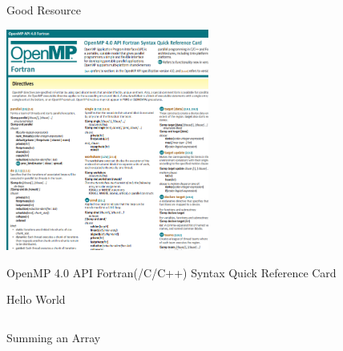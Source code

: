 \documentclass[10pt]{beamer}
\begin{document}
\begin{frame}{Good Resource}

\includegraphics[width=0.5\textwidth]{omp_cheat.png}

{\tiny OpenMP 4.0 API Fortran(/C/C++) Syntax Quick Reference Card}

\end{frame}

\begin{frame}{Hello World}

\begin{columns}[c]
  \begin{column}{0.5\textwidth}
    
  \end{column}
  \begin{column}{0.5\textwidth}
    
  \end{column}
\end{columns}

\end{frame}


\begin{frame}{Summing an Array}

\begin{columns}[c]
  \begin{column}{0.5\textwidth}
    
  \end{column}
  \begin{column}{0.5\textwidth}
    
  \end{column}
\end{columns}

\end{frame}
\end{document}
